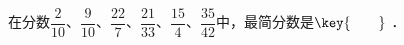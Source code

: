 在分数$\dfrac {2}{10}$、$\dfrac{9}{10}$、$\dfrac{22}{7}$、$\dfrac{21}{33}$、$\dfrac {15}{4}$、$\dfrac {35}{42}$中，最简分数是$\key{\qquad}$ ．